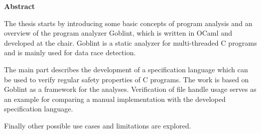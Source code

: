 \clearemptydoublepage
{}
{}

\vspace*{2cm}
\begin{center}
{\Large \bf Abstract}
\end{center}
\vspace{1cm}
The thesis starts by introducing some basic concepts of program analysis and an overview of the program analyzer Goblint, which is written in OCaml and developed at the chair. Goblint is a static analyzer for multi-threaded C programs and is mainly used for data race detection.

The main part describes the development of a specification language which can be used to verify regular safety properties of C programs. The work is based on Goblint as a framework for the analyses. Verification of file handle usage serves as an example for comparing a manual implementation with the developed specification language.

Finally other possible use cases and limitations are explored.